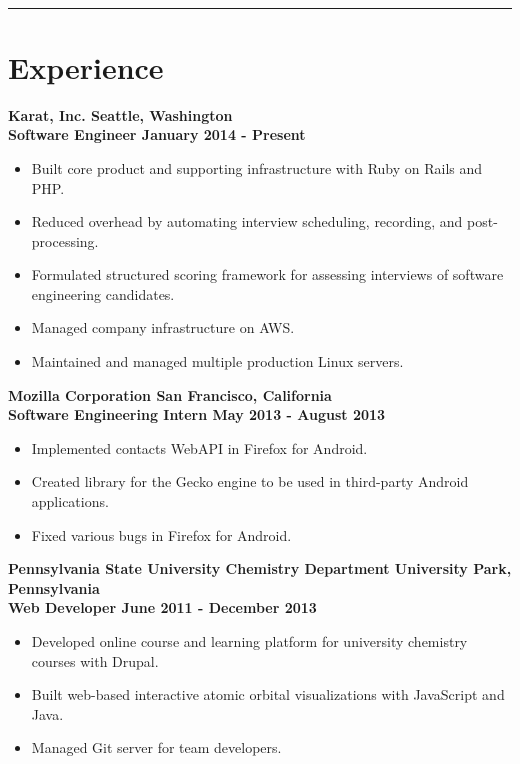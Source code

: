 \documentclass[letterpaper]{article}
\newcommand{\setfontsize}{\fontsize{11.5}{16}\selectfont}
\newcommand{\sectionrule}[1] {
  \noindent\rule{\textwidth}{.1mm}
  \vspace{-11mm}
  \section{#1}
}
\newenvironment{indentsection}
  {\begin{adjustwidth}{10mm}{0pt}}
  {\end{adjustwidth}}
\newcommand{\job}[5] {
  \noindent\textbf{#1 \hfill #2}\\
  \textbf{#3 \hfill #4 - #5}

  \vspace{1mm}
}
\begin{document}
  \setfontsize

  \vspace{2mm}\\

  \sectionrule{Experience}

  \begin{indentsection}
    \job{Karat, Inc.}{Seattle, Washington}{Software Engineer}{January 2014}{Present}
    \begin{itemize}
      \item Built core product and supporting infrastructure with Ruby on Rails and PHP.
      \item Reduced overhead by automating interview scheduling, recording, and post-processing.
      \item Formulated structured scoring framework for assessing interviews of software engineering candidates.
      \item Managed company infrastructure on AWS.
      \item Maintained and managed multiple production Linux servers.
    \end{itemize}

    \vspace{5mm}

    \job{Mozilla Corporation}{San Francisco, California}{Software Engineering Intern}{May 2013}{August 2013}
    \begin{itemize}
      \item Implemented contacts WebAPI in Firefox for Android.
      \item Created library for the Gecko engine to be used in third-party Android applications.
      \item Fixed various bugs in Firefox for Android.
    \end{itemize}

    \vspace{5mm}

    \job{Pennsylvania State University Chemistry Department}{University Park, Pennsylvania}{Web Developer}{June 2011}{December 2013}
    \begin{itemize}
      \item Developed online course and learning platform for university chemistry courses with Drupal.
      \item Built web-based interactive atomic orbital visualizations with JavaScript and Java.
      \item Managed Git server for team developers.
    \end{itemize}
  \end{indentsection}
\end{document}
